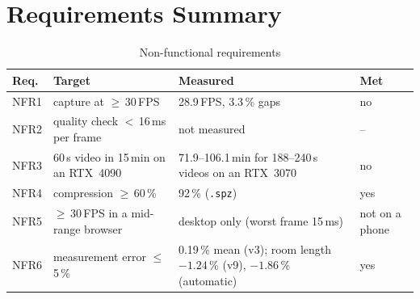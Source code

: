 \section{Requirements Summary}
\begin{table}[htbp]
\centering\small
\caption{Non-functional requirements}
\label{tab:eval-nfr}
\begin{tabular}{p{1.4cm}p{5.0cm}p{3.6cm}p{2.0cm}}
\toprule
\textbf{Req.} & \textbf{Target} & \textbf{Measured} & \textbf{Met} \\
\midrule
NFR1 & capture at $\geq$\,30\,FPS & 28.9\,FPS, 3.3\,\% gaps & no \\
NFR2 & quality check $<$\,16\,ms per frame & not measured & -- \\
NFR3 & 60\,s video in 15\,min on an RTX~4090 & 71.9--106.1\,min for 188--240\,s videos on an RTX~3070 & no \\
NFR4 & compression $\geq$\,60\,\% & 92\,\% (\texttt{.spz}) & yes \\
NFR5 & $\geq$\,30\,FPS in a mid-range browser & desktop only (worst frame 15\,ms) & not on a phone \\
NFR6 & measurement error $\leq$\,5\,\% & 0.19\,\% mean (v3); room length $-1.24$\,\% (v9), $-1.86$\,\% (automatic) & yes \\
\bottomrule
\end{tabular}
\end{table}
